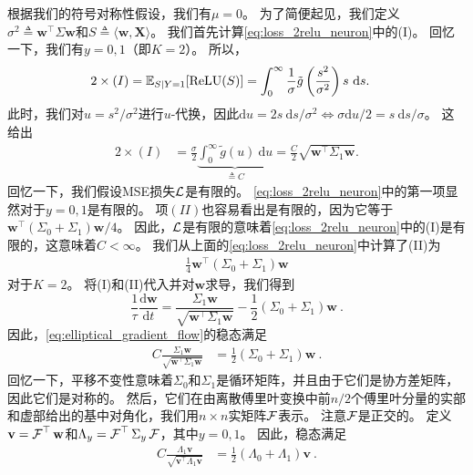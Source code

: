 根据我们的符号对称性假设，我们有$\mu = 0$。
为了简便起见，我们定义$\sigma^2 \triangleq \mathbf{w}^\top \Sigma \mathbf{w}$和$S \triangleq \langle \mathbf{w}, \mathbf{X} \rangle$。
我们首先计算\cref{eq:loss_2relu_neuron}中的(I)。
回忆一下，我们有$y = 0,1$（即$K = 2$）。
所以，
\begin{align*}
    2 \times (I)
    &= \operatorname{\mathbb{E}}_{S \mid Y=1}[ \operatorname{ReLU}( S ) ]
    = \int_0^{\infty} \frac{1}{\sigma} \tilde{g}\left( \frac{s^2}{\sigma^2} \right) s \ \mathrm{d}s.
\end{align*}
此时，我们对$u = s^2 / \sigma^2$进行$u$-代换，因此$\mathrm{d}u = 2 s \ \mathrm{d}s / \sigma^2 \iff \sigma \mathrm{d}u / 2 = s\ \mathrm{d}s / \sigma$。
这给出
\begin{align*}
    2 \times (I)
    &= \frac{\sigma}{2} \underbrace{\int_0^{\infty} \tilde{g}(u)\ \mathrm{d}u}_{\triangleq C}
    = \frac{C}{2} \sqrt{\mathbf{w}^\top \Sigma_1 \mathbf{w}}.
\end{align*}
回忆一下，我们假设MSE损失$\operatorname{\mathcal{L}}$是有限的。
\cref{eq:loss_2relu_neuron}中的第一项显然对于$y = 0,1$是有限的。
项$(II)$也容易看出是有限的，因为它等于$\mathbf{w}^\top (\Sigma_0 + \Sigma_1) \mathbf{w} / 4$。
因此，$\operatorname{\mathcal{L}}$是有限的意味着\cref{eq:loss_2relu_neuron}中的(I)是有限的，这意味着$C < \infty$。
我们从上面的\cref{eq:loss_2relu_neuron}中计算了(II)为
\begin{align*}
  \frac{1}{4} \mathbf{w}^\top \left( \Sigma_0 + \Sigma_1 \right) \mathbf{w}
\end{align*}
对于$K = 2$。
将(I)和(II)代入并对$\mathbf{w}$求导，我们得到
\begin{equation}
  \frac{1}{\tau} \frac{\mathrm{d}\mathbf{w}}{\mathrm{d}t} = \frac{\Sigma_1 \mathbf{w}}{\sqrt{\mathbf{w}^\top \Sigma_1 \mathbf{w}}} - \frac{1}{2} \left( \Sigma_0 + \Sigma_1 \right) \mathbf{w}~. \label{eq:elliptical_gradient_flow}
\end{equation}
因此，\cref{eq:elliptical_gradient_flow}的稳态满足
\begin{align*}
  C \frac{\Sigma_1 \mathbf{w}}{\sqrt{\mathbf{w}^\top \Sigma_1 \mathbf{w}}}
  &= \frac{1}{2} \left( \Sigma_0 + \Sigma_1 \right) \mathbf{w}~.
\end{align*}
回忆一下，平移不变性意味着$\Sigma_0$和$\Sigma_1$是循环矩阵，并且由于它们是协方差矩阵，因此它们是对称的。
然后，它们在由离散傅里叶变换中前$n/2$个傅里叶分量的实部和虚部给出的基中对角化，我们用$n \times n$实矩阵$\operatorname{\mathcal{F}}$表示。
注意$\operatorname{\mathcal{F}}$是正交的。
定义$\mathbf{v} = \operatorname{\mathcal{F}}^\top \mathbf{w}$和$\Lambda_y = \operatorname{\mathcal{F}}^\top \Sigma_y \operatorname{\mathcal{F}}$，其中$y = 0,1$。
因此，稳态满足
\begin{align*}
  C \frac{\Lambda_1 \mathbf{v}}{\sqrt{\mathbf{v}^\top \Lambda_1 \mathbf{v}}} &= \frac{1}{2} \left( \Lambda_0 + \Lambda_1 \right) \mathbf{v}~.
\end{align*}

